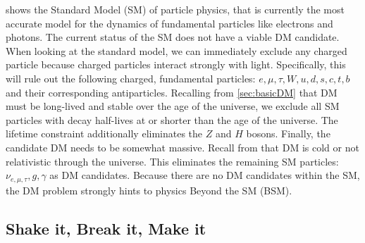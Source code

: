  shows the Standard Model (SM) of particle physics, that is currently the most accurate model for the dynamics of fundamental particles like electrons and photons.
The current status of the SM does not have a viable DM candidate.
When looking at the standard model, we can immediately exclude any charged particle because charged particles interact strongly with light.
Specifically, this will rule out the following charged, fundamental particles: $e,\mu, \tau, W, u, d, s, c, t, b$ and their corresponding antiparticles.
Recalling from \cref{sec:basicDM} that DM must be long-lived and stable over the age of the universe, we exclude all SM particles with decay half-lives at or shorter than the age of the universe.
The lifetime constraint additionally eliminates the $Z$ and $H$ bosons.
Finally, the candidate DM needs to be somewhat massive.
Recall from  that DM is cold or not relativistic through the universe.
This eliminates the remaining SM particles: $\nu_{e, \mu, \tau}, g, \gamma$ as DM candidates.
Because there are no DM candidates within the SM, the DM problem strongly hints to physics Beyond the SM (BSM).

\subsection{Shake it, Break it, Make it\label{sec:bop_it}}

\begin{figure}[h]
\end{figure}

